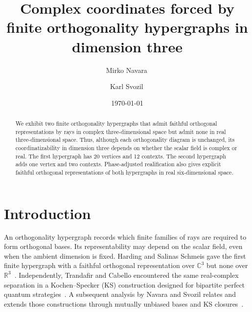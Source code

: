 \documentclass[twocolumn,aps,pra,floatfix,amsmath,amssymb,longbibliography]{revtex4-2}
\theoremstyle{definition}
\theoremstyle{remark}
\newcommand{\C}{\mathbb C}
\newcommand{\R}{\mathbb R}
\begin{document}
\title{Complex coordinates forced by finite orthogonality hypergraphs in dimension three}

\author{Mirko Navara\,}

\author{Karl Svozil\,}

\date{\today}

\begin{abstract}
We exhibit two finite orthogonality hypergraphs that admit faithful orthogonal representations by rays in complex three-dimensional space but admit none in real three-dimensional space. Thus, although each orthogonality diagram is unchanged, its coordinatizability in dimension three depends on whether the scalar field is complex or real. The first hypergraph has 20 vertices and 12 contexts. The second hypergraph adds one vertex and two contexts. Phase-adjusted realification also gives explicit faithful orthogonal representations of both hypergraphs in real six-dimensional space.
\end{abstract}

\maketitle

\section{Introduction}

An orthogonality hypergraph records which finite families of rays are required
to form orthogonal bases.  Its representability may depend on the scalar field,
even when the ambient dimension is fixed.  Harding and Salinas Schmeis gave the
first finite hypergraph with a faithful orthogonal representation over $\C^3$
but none over $\R^3$~\cite{harding2025remarksIJTP}.  Independently, Trandafir
and Cabello encountered the same real-complex separation in a
Kochen--Specker (KS) construction designed for bipartite perfect quantum
strategies~\cite{2024-cabello-trandafir0}.  A subsequent analysis by Navara and
Svozil relates and extends those constructions through mutually unbiased bases
and KS closures~\cite{svozil-2025-MYOCHS}.
\end{document}
